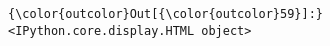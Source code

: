 \documentclass[11pt]{article}
\begin{document}
\begin{Verbatim}[commandchars=\\\{\}]
{\color{outcolor}Out[{\color{outcolor}59}]:} <IPython.core.display.HTML object>
\end{Verbatim}
            

    
    
    
    
\end{document}
